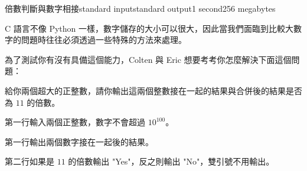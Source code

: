 \begin{problem}{倍數判斷與數字相接}{standard input}{standard output}{1 second}{256 megabytes}

C 語言不像 Python 一樣，數字儲存的大小可以很大，因此當我們面臨到比較大數字的問題時往往必須透過一些特殊的方法來處理。

為了測試你有沒有具備這個能力，Colten 與 Eric 想要考考你怎麼解決下面這個問題：

給你兩個超大的正整數，請你輸出這兩個整數接在一起的結果與合併後的結果是否為 $11$ 的倍數。

\InputFile
第一行輸入兩個正整數，數字不會超過 $10^{100}$。

\OutputFile
第一行輸出兩個數字接在一起後的結果。

第二行如果是 $11$ 的倍數輸出 "Yes"，反之則輸出 "No"，雙引號不用輸出。

\Examples

\begin{example}
%
%
\end{example}

\end{problem}

